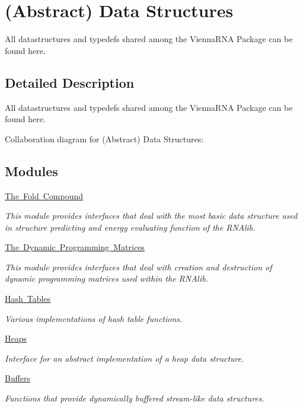 \hypertarget{group__data__structures}{}\section{(Abstract) Data Structures}
\label{group__data__structures}


All datastructures and typedefs shared among the Vienna\+R\+NA Package can be found here.  




\subsection{Detailed Description}
All datastructures and typedefs shared among the Vienna\+R\+NA Package can be found here. 

Collaboration diagram for (Abstract) Data Structures\+:
\subsection*{Modules}
\begin{DoxyCompactItemize}
\item 
\mbox{\hyperlink{group__fold__compound}{The Fold Compound}}
\begin{DoxyCompactList}\small\item\em This module provides interfaces that deal with the most basic data structure used in structure predicting and energy evaluating function of the R\+N\+Alib. \end{DoxyCompactList}\item 
\mbox{\hyperlink{group__dp__matrices}{The Dynamic Programming Matrices}}
\begin{DoxyCompactList}\small\item\em This module provides interfaces that deal with creation and destruction of dynamic programming matrices used within the R\+N\+Alib. \end{DoxyCompactList}\item 
\mbox{\hyperlink{group__hash__table__utils}{Hash Tables}}
\begin{DoxyCompactList}\small\item\em Various implementations of hash table functions. \end{DoxyCompactList}\item 
\mbox{\hyperlink{group__heap__utils}{Heaps}}
\begin{DoxyCompactList}\small\item\em Interface for an abstract implementation of a heap data structure. \end{DoxyCompactList}\item 
\mbox{\hyperlink{group__buffer__utils}{Buffers}}
\begin{DoxyCompactList}\small\item\em Functions that provide dynamically buffered stream-\/like data structures. \end{DoxyCompactList}\end{DoxyCompactItemize}
